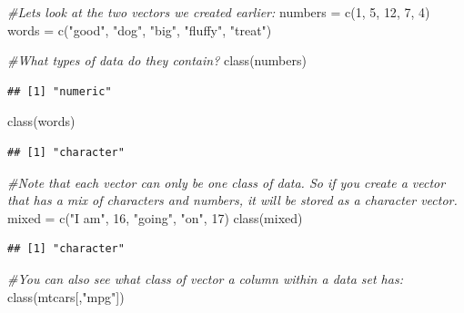 \documentclass[
]{book}
\newenvironment{Shaded}{\begin{snugshade}}{\end{snugshade}}
\newcommand{\CommentTok}[1]{\textcolor[rgb]{0.56,0.35,0.01}{\textit{#1}}}
\newcommand{\DecValTok}[1]{\textcolor[rgb]{0.00,0.00,0.81}{#1}}
\newcommand{\FunctionTok}[1]{\textcolor[rgb]{0.00,0.00,0.00}{#1}}
\newcommand{\NormalTok}[1]{#1}
\newcommand{\OtherTok}[1]{\textcolor[rgb]{0.56,0.35,0.01}{#1}}
\newcommand{\StringTok}[1]{\textcolor[rgb]{0.31,0.60,0.02}{#1}}
\begin{document}
\begin{Shaded}
\begin{Highlighting}[]
\CommentTok{\#Let\textquotesingle{}s look at the two vectors we created earlier:}
\NormalTok{numbers }\OtherTok{=} \FunctionTok{c}\NormalTok{(}\DecValTok{1}\NormalTok{, }\DecValTok{5}\NormalTok{, }\DecValTok{12}\NormalTok{, }\DecValTok{7}\NormalTok{, }\DecValTok{4}\NormalTok{)   }
\NormalTok{words }\OtherTok{=} \FunctionTok{c}\NormalTok{(}\StringTok{"good"}\NormalTok{, }\StringTok{"dog"}\NormalTok{, }\StringTok{"big"}\NormalTok{, }\StringTok{"fluffy"}\NormalTok{, }\StringTok{"treat"}\NormalTok{)}

\CommentTok{\#What types of data do they contain?}
\FunctionTok{class}\NormalTok{(numbers)}
\end{Highlighting}
\end{Shaded}

\begin{verbatim}
## [1] "numeric"
\end{verbatim}

\begin{Shaded}
\begin{Highlighting}[]
\FunctionTok{class}\NormalTok{(words)}
\end{Highlighting}
\end{Shaded}

\begin{verbatim}
## [1] "character"
\end{verbatim}

\begin{Shaded}
\begin{Highlighting}[]
\CommentTok{\#Note that each vector can only be one class of data. So if you create a vector that has a mix of characters and numbers, it will be stored as a character vector.}
\NormalTok{mixed }\OtherTok{=} \FunctionTok{c}\NormalTok{(}\StringTok{"I am"}\NormalTok{, }\DecValTok{16}\NormalTok{, }\StringTok{"going"}\NormalTok{, }\StringTok{"on"}\NormalTok{, }\DecValTok{17}\NormalTok{)}
\FunctionTok{class}\NormalTok{(mixed)}
\end{Highlighting}
\end{Shaded}

\begin{verbatim}
## [1] "character"
\end{verbatim}

\begin{Shaded}
\begin{Highlighting}[]
\CommentTok{\#You can also see what class of vector a column within a data set has:}
\FunctionTok{class}\NormalTok{(mtcars[,}\StringTok{"mpg"}\NormalTok{])}
\end{Highlighting}
\end{Shaded}
\end{document}
